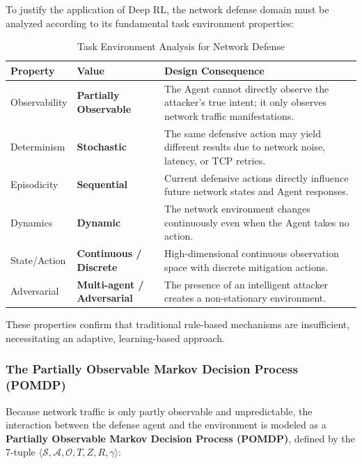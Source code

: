 \documentclass[12pt,a4paper]{report}
\begin{document}
To justify the application of Deep RL, the network defense domain must be analyzed according to its fundamental task environment properties:

\begin{table}[htbp]
\centering
\caption{Task Environment Analysis for Network Defense}
\label{tab:task_environment}
\begin{tabular}{L{3cm} L{4cm} L{8cm}}
\toprule
\textbf{Property} & \textbf{Value} & \textbf{Design Consequence} \\
\midrule
Observability & \textbf{Partially Observable} & The Agent cannot directly observe the attacker's true intent; it only observes network traffic manifestations. \\
Determinism & \textbf{Stochastic} & The same defensive action may yield different results due to network noise, latency, or TCP retries. \\
Episodicity & \textbf{Sequential} & Current defensive actions directly influence future network states and Agent responses. \\
Dynamics & \textbf{Dynamic} & The network environment changes continuously even when the Agent takes no action. \\
State/Action & \textbf{Continuous / Discrete} & High-dimensional continuous observation space with discrete mitigation actions. \\
Adversarial & \textbf{Multi-agent / Adversarial} & The presence of an intelligent attacker creates a non-stationary environment. \\
\bottomrule
\end{tabular}
\end{table}

These properties confirm that traditional rule-based mechanisms are insufficient, necessitating an adaptive, learning-based approach.

\subsubsection*{The Partially Observable Markov Decision Process (POMDP)}

Because network traffic is only partly observable and unpredictable, the interaction between the defense agent and the environment is modeled as a \textbf{Partially Observable Markov Decision Process (POMDP)}, defined by the 7-tuple $\langle \mathcal{S}, \mathcal{A}, \mathcal{O}, T, Z, R, \gamma \rangle$:
\end{document}
